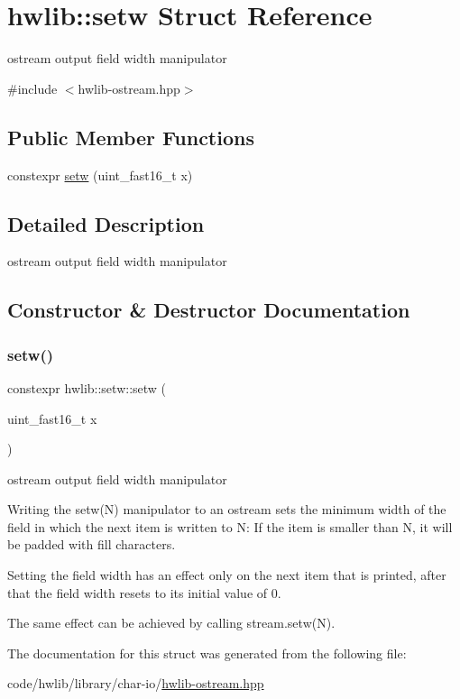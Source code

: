 \hypertarget{structhwlib_1_1setw}{}\section{hwlib\+:\+:setw Struct Reference}
\label{structhwlib_1_1setw}


ostream output field width manipulator  




{\ttfamily \#include $<$hwlib-\/ostream.\+hpp$>$}

\subsection*{Public Member Functions}
\begin{DoxyCompactItemize}
\item 
constexpr \hyperlink{structhwlib_1_1setw_ae299e9da6021aae93451b93cab6a2850}{setw} (uint\+\_\+fast16\+\_\+t x)
\end{DoxyCompactItemize}


\subsection{Detailed Description}
ostream output field width manipulator 

\subsection{Constructor \& Destructor Documentation}
\mbox{\label{structhwlib_1_1setw_ae299e9da6021aae93451b93cab6a2850}} 
\subsubsection{\texorpdfstring{setw()}{setw()}}
{\footnotesize\ttfamily constexpr hwlib\+::setw\+::setw (\begin{DoxyParamCaption}\item[{uint\+\_\+fast16\+\_\+t}]{x }\end{DoxyParamCaption})\hspace{0.3cm}{\ttfamily [inline]}}

ostream output field width manipulator

Writing the setw(\+N) manipulator to an ostream sets the minimum width of the field in which the next item is written to N\+: If the item is smaller than N, it will be padded with fill characters.

Setting the field width has an effect only on the next item that is printed, after that the field width resets to its initial value of 0.

The same effect can be achieved by calling stream.\+setw(\+N). 

The documentation for this struct was generated from the following file\+:\begin{DoxyCompactItemize}
\item 
code/hwlib/library/char-\/io/\hyperlink{hwlib-ostream_8hpp}{hwlib-\/ostream.\+hpp}\end{DoxyCompactItemize}
